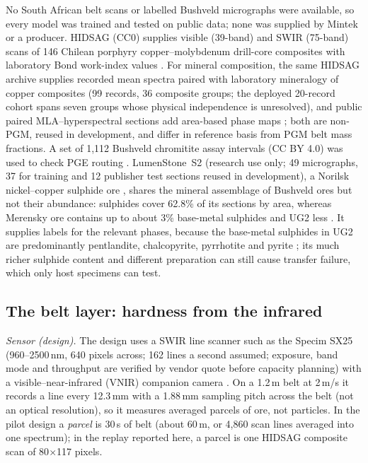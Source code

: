 \documentclass[10pt,a4paper,twocolumn]{article}
\begin{document}
No South African belt scans or labelled Bushveld micrographs were available, so every model was trained and tested on public data; none was supplied by Mintek or a producer. HIDSAG (CC0) supplies visible (39-band) and SWIR (75-band) scans of 146 Chilean porphyry copper--molybdenum drill-core composites with laboratory Bond work-index values \cite{ehrenfeld2023}. For mineral composition, the same HIDSAG archive supplies recorded mean spectra paired with laboratory mineralogy of copper composites (99 records, 36 composite groups; the deployed 20-record cohort spans seven groups whose physical independence is unresolved), and public paired MLA--hyperspectral sections add area-based phase maps \cite{rodare}; both are non-PGM, reused in development, and differ in reference basis from PGM belt mass fractions. A set of 1,112 Bushveld chromitite assay intervals (CC BY 4.0) was used to check PGE routing \cite{bachmann2019}. LumenStone~S2 (research use only; 49 micrographs, 37 for training and 12 publisher test sections reused in development), a Norilsk nickel--copper sulphide ore \cite{korshunov2025}, shares the mineral assemblage of Bushveld ores but not their abundance: sulphides cover 62.8\% of its sections by area, whereas Merensky ore contains up to about 3\% base-metal sulphides and UG2 less \cite{jones2005}. It supplies labels for the relevant phases, because the base-metal sulphides in UG2 are predominantly pentlandite, chalcopyrite, pyrrhotite and pyrite \cite{jones2005}; its much richer sulphide content and different preparation can still cause transfer failure, which only host specimens can test.


\subsection{The belt layer: hardness from the infrared}\label{sec:beltmethod}

\emph{Sensor (design).} The design uses a SWIR line scanner such as the Specim SX25 (960--2500\,nm, 640 pixels across; 162 lines a second assumed; exposure, band mode and throughput are verified by vendor quote before capacity planning) with a visible--near-infrared (VNIR) companion camera \cite{specim}. On a 1.2\,m belt at 2\,m/s it records a line every 12.3\,mm with a 1.88\,mm sampling pitch across the belt (not an optical resolution), so it measures averaged parcels of ore, not particles. In the pilot design a \emph{parcel} is 30\,s of belt (about 60\,m, or 4,860 scan lines averaged into one spectrum); in the replay reported here, a parcel is one HIDSAG composite scan of 80$\times$117 pixels.
\end{document}
